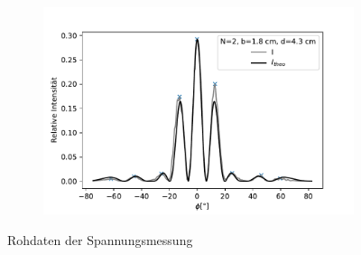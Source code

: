 \documentclass[12pt,a4paper]{article}
\begin{document}
\begin{figure}[H]
\begin{subfigure}{.5\textwidth}
	\end{subfigure}%
	\begin{subfigure}{.5\textwidth}
		\centering
		\includegraphics[width=0.9\linewidth]{Rohdaten/Images/doppelspalt_3}
	\end{subfigure}
	\caption{Rohdaten der Spannungsmessung}
	\label{fig:daten_mit_theo}
\end{figure}
\end{document}
